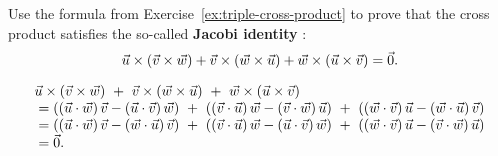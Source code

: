 \documentclass{ximera}
\begin{document}
  
  \begin{example}
    Use the formula from Exercise~\ref{ex:triple-cross-product} to prove
    that the cross product satisfies the so-called \textbf{Jacobi
      identity}%
    :
    \begin{equation*}
      \vec{u}\times(\vec{v}\times\vec{w})
      + \vec{v}\times(\vec{w}\times\vec{u})
      + \vec{w}\times(\vec{u}\times\vec{v})
      = \vec{0}.
    \end{equation*}
    \begin{solution}
      \begin{equation*}
        \begin{array}{l}
          \vec{u}\times(\vec{v}\times\vec{w})
          ~+~ \vec{v}\times(\vec{w}\times\vec{u})
          ~+~ \vec{w}\times(\vec{u}\times\vec{v}) \\
          {} = ((\vec{u}\cdot\vec{w})\,\vec{v}
          - (\vec{u}\cdot\vec{v})\,\vec{w})
          ~+~ ((\vec{v}\cdot\vec{u})\,\vec{w}
          - (\vec{v}\cdot\vec{w})\,\vec{u})
          ~+~ ((\vec{w}\cdot\vec{v})\,\vec{u}
          - (\vec{w}\cdot\vec{u})\,\vec{v}) \\
          {} = ((\vec{u}\cdot\vec{w})\,\vec{v}
          - (\vec{w}\cdot\vec{u})\,\vec{v})
          ~+~ ((\vec{v}\cdot\vec{u})\,\vec{w}
          - (\vec{u}\cdot\vec{v})\,\vec{w})
          ~+~ ((\vec{w}\cdot\vec{v})\,\vec{u}
          - (\vec{v}\cdot\vec{w})\,\vec{u}) \\
          {} = \vec{0}.
        \end{array}
      \end{equation*}
    \end{solution}
    \vspace{-4ex}
  \end{example}
\end{document}
